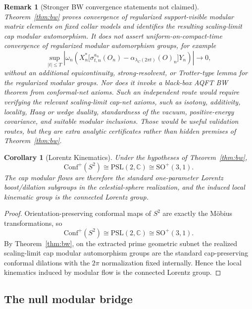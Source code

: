 \documentclass[11pt]{article}
\newtheorem{corollary}[theorem]{Corollary}
\newtheorem{remark}[theorem]{Remark}
\newcommand{\Conf}{\mathrm{Conf}}
\begin{document}
\begin{remark}[Stronger BW convergence statements not claimed]\label{rem:bw-stronger-not-claimed}
Theorem~\ref{thm:bw} proves convergence of regularized support-visible modular matrix elements
on fixed collar models and identifies the resulting scaling-limit cap modular automorphism. It
does not assert uniform-on-compact-time convergence of regularized modular automorphism groups,
for example
\[
\sup_{|t|\le T}
\left|
\omega_n\!\left(
X_n^\ast\bigl[
\sigma^{a_n}_{t,n}(O_n)
-
\alpha_{\lambda_C(2\pi t)}(O)_n
\bigr]Y_n
\right)
\right|
\to0,
\]
without an additional equicontinuity, strong-resolvent, or Trotter-type lemma for the
regularized modular groups. Nor does it invoke a black-box AQFT BW theorem from conformal-net
axioms. Such an independent route would require verifying the relevant scaling-limit cap-net
axioms, such as isotony, additivity, locality, Haag or wedge duality, standardness of the vacuum,
positive-energy covariance, and suitable modular inclusions. Those would be useful validation
routes, but they are extra analytic certificates rather than hidden premises of
Theorem~\ref{thm:bw}.
\end{remark}

\begin{corollary}[Lorentz Kinematics]\label{cor:lorentz}
Under the hypotheses of Theorem~\ref{thm:bw},
\[
\Conf^+(S^2)\cong \mathrm{PSL}(2,\mathbb C)\cong \mathrm{SO}^+(3,1).
\]
The cap modular flows are therefore the standard one-parameter Lorentz boost/dilation subgroups in the celestial-sphere realization, and the induced local kinematic group is the connected Lorentz group.
\end{corollary}

\begin{proof}
Orientation-preserving conformal maps of \(S^2\) are exactly the M\"obius transformations, so
\[
\Conf^+(S^2)\cong \mathrm{PSL}(2,\mathbb C)\cong \mathrm{SO}^+(3,1).
\]
By Theorem~\ref{thm:bw}, on the extracted prime geometric subnet the realized scaling-limit cap modular automorphism groups are the standard cap-preserving conformal dilations with the \(2\pi\) normalization fixed internally. Hence the local kinematics induced by modular flow is the connected Lorentz group.
\end{proof}
\subsection{The null modular bridge}
\end{document}
